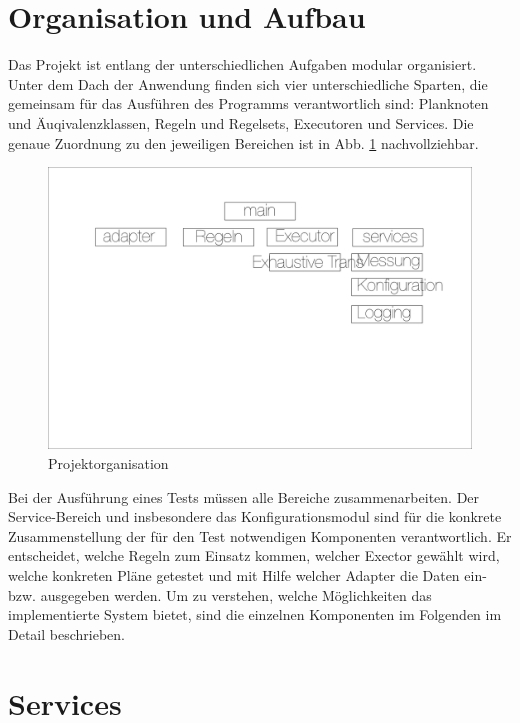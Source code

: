 
\section{Organisation und Aufbau}


Das Projekt ist entlang der unterschiedlichen Aufgaben modular organisiert. Unter dem Dach der Anwendung finden sich vier unterschiedliche Sparten, die gemeinsam für das Ausführen des Programms verantwortlich sind: Planknoten und Äuqivalenzklassen, Regeln und Regelsets, Executoren und Services. Die genaue Zuordnung zu den jeweiligen Bereichen ist in Abb. \ref{ProjectOrga} nachvollziehbar.


\begin{figure}[h]
  \centering
  \includegraphics[width=\textwidth]{04_Implementierung/Matrix.png}
  \caption{Projektorganisation}
  \label{ProjectOrga}
\end{figure}

Bei der Ausführung eines Tests  müssen alle Bereiche zusammenarbeiten. Der Service-Bereich und insbesondere das Konfigurationsmodul sind für die konkrete Zusammenstellung der für den Test notwendigen Komponenten verantwortlich. Er entscheidet, welche Regeln zum Einsatz kommen, welcher Exector gewählt wird, welche konkreten Pläne getestet und mit Hilfe welcher Adapter die Daten ein-  bzw. ausgegeben werden. Um zu verstehen, welche Möglichkeiten das implementierte System bietet, sind die einzelnen Komponenten im Folgenden im Detail beschrieben.


\section{Services}

